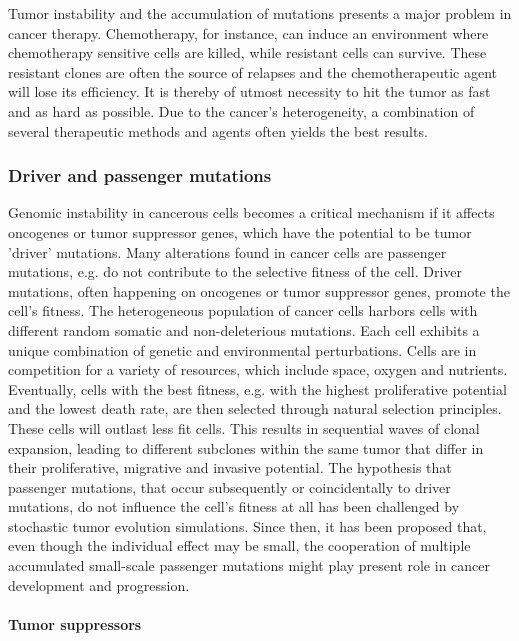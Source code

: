     Tumor instability and the accumulation of mutations presents a major problem
    in cancer therapy. Chemotherapy, for instance, can induce an environment where
    chemotherapy sensitive cells are killed, while resistant cells can survive.
    These resistant clones are often the source of relapses and the
    chemotherapeutic agent will lose its efficiency. It is thereby of utmost
    necessity to hit the tumor as fast and as hard as possible. Due to the
    cancer's heterogeneity, a combination of several therapeutic methods and
    agents often yields the best results.

    \subsubsection{Driver and passenger mutations}

      Genomic instability in cancerous cells becomes a critical mechanism if it
      affects oncogenes or tumor suppressor genes, which have the potential to
      be tumor 'driver' mutations. Many alterations found in cancer cells are
      passenger mutations, e.g. do not contribute to the selective fitness of
      the cell. Driver mutations, often happening on oncogenes or tumor
      suppressor genes, promote the cell's fitness. The heterogeneous population
      of cancer cells harbors cells with different random somatic and
      non-deleterious mutations. Each cell exhibits a unique combination of
      genetic and environmental perturbations. Cells are in competition for a
      variety of resources, which include space, oxygen and nutrients.
      Eventually, cells with the best fitness, e.g. with the highest
      proliferative potential  and the lowest death rate, are then selected
      through natural selection principles. These cells will outlast less fit
      cells. This results in sequential waves of clonal expansion, leading to
      different subclones within the same tumor that differ in their
      proliferative, migrative and invasive potential. The hypothesis that
      passenger mutations, that occur subsequently or coincidentally to driver
      mutations, do not influence the cell's fitness at all has been challenged
      by stochastic tumor evolution simulations. Since then, it has been
      proposed that, even though the individual effect may be small, the
      cooperation of multiple accumulated small-scale passenger mutations might
      play present role in cancer development and progression.

      \paragraph{Tumor suppressors}


